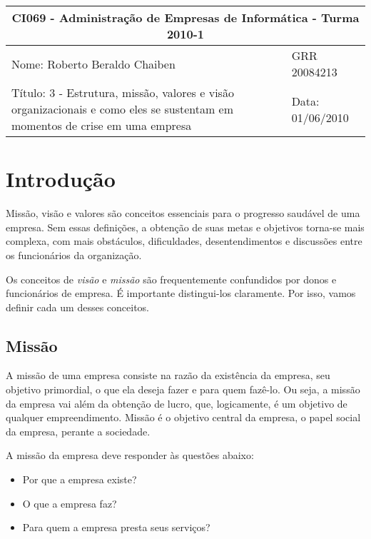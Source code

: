 \documentclass[12pt]{article}
\begin{document}
\setlength{\parskip}{2ex}

\begin{tabular}[l]{ | p{10cm} | l | }
  \hline
  \multicolumn{2}{|c|}{CI069 - Administração de Empresas de Informática - Turma 2010-1} \\
  \hline
  Nome: Roberto Beraldo Chaiben & 
  GRR 20084213 \\
  \hline
  Título: 3 - Estrutura, missão, valores e visão organizacionais e como eles se sustentam em momentos de crise em uma empresa &
  Data: 01/06/2010 \\
  \hline
\end{tabular}


\vspace{1cm}


\section{Introdução}

Missão, visão e valores são conceitos essenciais para o progresso saudável de uma empresa. Sem essas definições, a obtenção de suas metas e objetivos
torna-se mais complexa, com mais obstáculos, dificuldades, desentendimentos e discussões entre os funcionários da organização.

Os conceitos de \textit{visão} e \textit{missão} são frequentemente confundidos por donos e funcionários de empresa. É importante distingui-los claramente.
Por isso, vamos definir cada um desses conceitos.


\subsection{Missão}

A missão de uma empresa consiste na razão da existência da empresa, seu objetivo primordial, o que ela deseja fazer e para quem fazê-lo. Ou seja, a missão
da empresa vai além da obtenção de lucro, que, logicamente, é um objetivo de qualquer empreendimento. Missão é o objetivo central da empresa, o papel social
da empresa, perante a sociedade.

A missão da empresa deve responder às questões abaixo:

\begin{itemize}

	\item Por que a empresa existe?
	\item O que a empresa faz?
	\item Para quem a empresa presta seus serviços?

\end{itemize}
\end{document}
